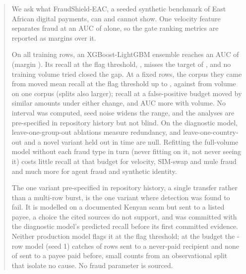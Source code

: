 \begin{abstract}
We ask what FraudShield-EAC, a seeded synthetic benchmark of East African digital payments, can and cannot show. One velocity feature separates fraud at an
AUC of \nGateFloor{} alone, so the gate ranking metrics are reported as margins over it.

On all \nFvTrainRows{} training rows, an XGBoost-LightGBM ensemble reaches an AUC of
\nFvAUC{} (margin \nFvMargin{}). Its recall at the flag threshold, \nFvRecallSix{}, misses the
target of \nTargetRecall{}, and no training volume tried closed the gap. At a fixed
\nTrainUsed{} rows, the corpus they came from moved mean recall at the flag threshold up to
\nSelMeanRange{}, against \nFvSeedGainFixed{} from volume on one corpus (splits also larger); recall at a \nFPRBudget{} false-positive budget moved by
similar amounts under either change, and AUC more with volume. No interval was computed, seed noise
widens the range, and the analyses are pre-specified in
repository history but not blind. On the diagnostic model, leave-one-group-out ablations
measure redundancy, and leave-one-country-out and a novel variant held out in time are null.
Refitting the full-volume model without each fraud type in turn (never fitting on it, not never
seeing it) costs little recall at that
budget for velocity, SIM-swap and mule fraud and much more for agent
fraud and synthetic identity.

The one variant pre-specified in repository history, a single transfer rather than a multi-row
burst, is the one variant where detection was found to fail. It is modelled on a documented Kenyan scam but sent to a
listed payee, a choice the cited sources do not support, and was committed with the diagnostic
model's predicted recall before its first committed evidence. Neither production model flags it at
the flag threshold; at the budget the \nTrainUsed{}-row model (seed 1) catches
\nGateRevNewBudgetCaught{} of \nGateRevNewBudgetRows{} rows sent to a never-paid recipient and none of
\nGateRevKnownBudgetRows{} sent to a payee paid before, small counts from an observational split that isolate
no cause. No fraud parameter is sourced.
\end{abstract}
